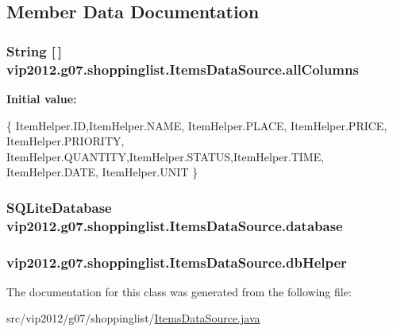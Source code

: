 \subsection{Member Data Documentation}
\hypertarget{classvip2012_1_1g07_1_1shoppinglist_1_1ItemsDataSource_a0695a611639f051273a04737321f7edc}{
\subsubsection[{all\-Columns}]{\setlength{\rightskip}{0pt plus 5cm}String \mbox{[}$\,$\mbox{]} vip2012.\-g07.\-shoppinglist.\-Items\-Data\-Source.\-all\-Columns\hspace{0.3cm}{\ttfamily [private]}}}\label{classvip2012_1_1g07_1_1shoppinglist_1_1ItemsDataSource_a0695a611639f051273a04737321f7edc}
{\bfseries Initial value\-:}
\begin{DoxyCode}
 \{ ItemHelper.ID,ItemHelper.NAME,
            ItemHelper.PLACE, ItemHelper.PRICE, ItemHelper.PRIORITY, 
            ItemHelper.QUANTITY,ItemHelper.STATUS,ItemHelper.TIME, 
            ItemHelper.DATE, ItemHelper.UNIT \}
\end{DoxyCode}
\hypertarget{classvip2012_1_1g07_1_1shoppinglist_1_1ItemsDataSource_a36fcfdcb49b8aa65c09e76e4ffbe082f}{
\subsubsection[{database}]{\setlength{\rightskip}{0pt plus 5cm}S\-Q\-Lite\-Database vip2012.\-g07.\-shoppinglist.\-Items\-Data\-Source.\-database\hspace{0.3cm}{\ttfamily [private]}}}\label{classvip2012_1_1g07_1_1shoppinglist_1_1ItemsDataSource_a36fcfdcb49b8aa65c09e76e4ffbe082f}
\hypertarget{classvip2012_1_1g07_1_1shoppinglist_1_1ItemsDataSource_a1ae51344b41caf6d6ecb0130ef6befee}{
\subsubsection[{db\-Helper}]{ vip2012.\-g07.\-shoppinglist.\-Items\-Data\-Source.\-db\-Helper\hspace{0.3cm}{\ttfamily [private]}}}\label{classvip2012_1_1g07_1_1shoppinglist_1_1ItemsDataSource_a1ae51344b41caf6d6ecb0130ef6befee}


The documentation for this class was generated from the following file\-:\begin{DoxyCompactItemize}
\item 
src/vip2012/g07/shoppinglist/\hyperlink{ItemsDataSource_8java}{Items\-Data\-Source.\-java}\end{DoxyCompactItemize}
